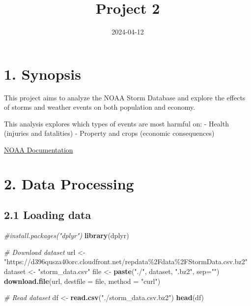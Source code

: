 \documentclass[
]{article}
\title{Project 2}
\author{}
\date{\vspace{-2.5em}2024-04-12}
\newenvironment{Shaded}{\begin{snugshade}}{\end{snugshade}}
\newcommand{\AttributeTok}[1]{\textcolor[rgb]{0.13,0.29,0.53}{#1}}
\newcommand{\CommentTok}[1]{\textcolor[rgb]{0.56,0.35,0.01}{\textit{#1}}}
\newcommand{\FunctionTok}[1]{\textcolor[rgb]{0.13,0.29,0.53}{\textbf{#1}}}
\newcommand{\NormalTok}[1]{#1}
\newcommand{\OtherTok}[1]{\textcolor[rgb]{0.56,0.35,0.01}{#1}}
\newcommand{\StringTok}[1]{\textcolor[rgb]{0.31,0.60,0.02}{#1}}
\begin{document}
\maketitle

\hypertarget{synopsis}{%
\section{1. Synopsis}\label{synopsis}}

This project aims to analyze the NOAA Storm Database and explore the
effects of storms and weather events on both population and economy.

This analysis explores which types of events are most harmful on: -
Health (injuries and fatalities) - Property and crops (economic
consequences)

\href{https://d396qusza40orc.cloudfront.net/repdata\%2Fpeer2_doc\%2Fpd01016005curr.pdf}{NOAA
Documentation}

\hypertarget{data-processing}{%
\section{2. Data Processing}\label{data-processing}}

\hypertarget{loading-data}{%
\subsection{2.1 Loading data}\label{loading-data}}

\begin{Shaded}
\begin{Highlighting}[]
\CommentTok{\#install.packages("dplyr")}
\FunctionTok{library}\NormalTok{(dplyr)}

\CommentTok{\# Download dataset}
\NormalTok{url }\OtherTok{\textless{}{-}} \StringTok{"https://d396qusza40orc.cloudfront.net/repdata\%2Fdata\%2FStormData.csv.bz2"}
\NormalTok{dataset }\OtherTok{\textless{}{-}} \StringTok{"storm\_data.csv"}
\NormalTok{file }\OtherTok{\textless{}{-}} \FunctionTok{paste}\NormalTok{(}\StringTok{"./"}\NormalTok{, dataset, }\StringTok{".bz2"}\NormalTok{, }\AttributeTok{sep=}\StringTok{""}\NormalTok{)}
\FunctionTok{download.file}\NormalTok{(url, }\AttributeTok{destfile =}\NormalTok{ file, }\AttributeTok{method =} \StringTok{"curl"}\NormalTok{)}
\end{Highlighting}
\end{Shaded}

\begin{Shaded}
\begin{Highlighting}[]
\CommentTok{\# Read dataset}
\NormalTok{df }\OtherTok{\textless{}{-}} \FunctionTok{read.csv}\NormalTok{(}\StringTok{"./storm\_data.csv.bz2"}\NormalTok{)}
\FunctionTok{head}\NormalTok{(df)}
\end{Highlighting}
\end{Shaded}
\end{document}
